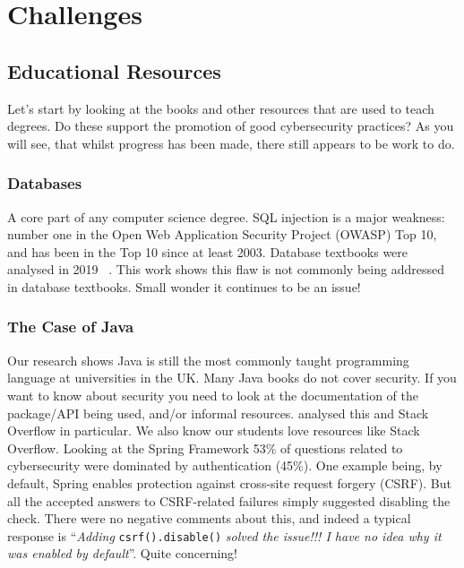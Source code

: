 \documentclass[a4paper,11pt]{article}
\begin{document}
\section*{Challenges} \label{sec}
\subsection*{Educational Resources}\label{sec:EDResource}
Let's start by looking at the books and other resources that are used to teach degrees. Do these support the promotion of good cybersecurity practices? As you will see, that whilst progress has been made, there still appears to be work to do.
\subsubsection*{Databases}\label{sec:SQL}
A core part of any computer science degree. SQL injection is a major weakness: number one in the Open Web Application Security Project (OWASP) Top 10, and has been in the Top 10 since at least 2003. Database textbooks were analysed in 2019 ~\cite{Drop2019}.  This work shows this flaw is not commonly being addressed in database textbooks. Small wonder it continues to be an issue!

\subsubsection*{The Case of Java}\label{sec:Java}
Our research shows Java is still the most commonly taught programming language at universities in the UK. Many Java books do not cover security.  If you want to know about security you need to look at the documentation of the package/API being used, and/or  informal resources. \cite{Mengetal2018a} analysed this and Stack Overflow in particular. We also know our students love resources like Stack Overflow. Looking at the Spring Framework 53\% of questions related to cybersecurity were dominated by authentication (45\%). One example being, by default, Spring enables protection against cross-site request forgery (CSRF). But all the accepted answers to CSRF-related failures simply suggested disabling the check. There were no negative comments about this, and indeed a typical response is ``{\emph{Adding}} \verb!csrf().disable()!
{\emph{{solved the issue!!! I have no idea why it was enabled by default}}''. } Quite concerning!
\end{document}
